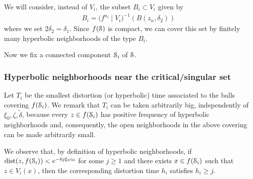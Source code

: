 \documentclass[reqno,12pt,a4paper]{amsart}
\theoremstyle{plain}
\theoremstyle{definition}
\begin{document}
  We will consider, instead of $V_i$, the subset $B_i\subset
  V_i$ given by
  \begin{align}
    \label{eq:halfball}
    B_i = \big(f^{n_i}\mid
    V_i\big)^{-1}(B(z_n,\delta_2))
  \end{align}
  where we set $2\delta_2=\delta_1$.  Since $f({\EuScript{S}})$ is
  compact, we can cover this set by finitely many hyperbolic
  neighborhoods of the type $B_i$.

  Now we fix a connected component ${\EuScript{S}}_i$ of ${\EuScript{S}}$.

  \subsubsection{Hyperbolic neighborhoods near the
    critical/singular set}
\label{sec:hyperb-neighb-near}

Let $T_i$ be the smallest distortion (or hyperbolic) time
associated to the balls covering $f({\EuScript{S}}_i)$.  We remark that
$T_i$ can be taken arbitrarily big, independently of
$\xi_0,\zeta,\tilde\delta$, because every $z\in f({\EuScript{S}}_i)$
has positive frequency of hyperbolic neighborhoods and,
consequently, the open neighborhoods in the above covering
can be made arbitrarily small.

We observe that, by definition of hyperbolic neighborhoods,
if ${\operatorname{dist}}(z,f({\EuScript{S}}_i))<e^{-b j \xi_0 c_0}$ for some $j\ge1$
and there exists $x\in f({\EuScript{S}}_i)$ such that $z\in V_i(x)$,
then the corresponding distortion time $h_i$ satisfies
$h_i\ge j$.
\end{document}
